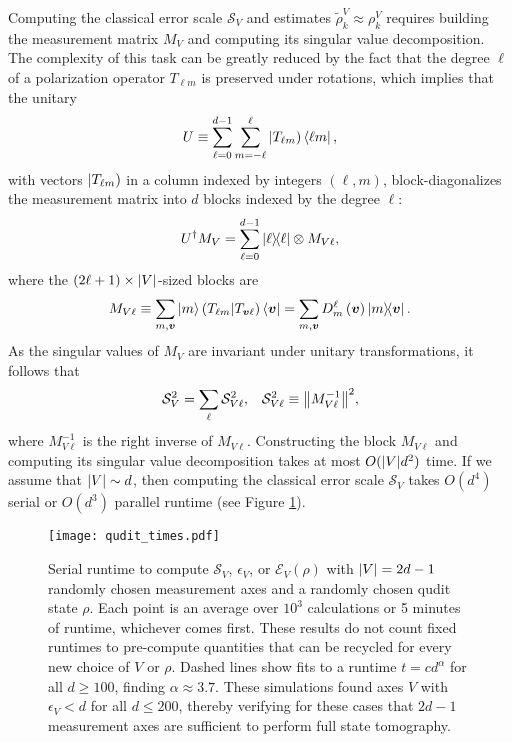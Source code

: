 \documentclass[notitlepage,twocolumn]{revtex4-2}
\newcommand{\p}[1]{\left(#1\right)} %
\renewcommand{\v}{\bm} %
\newcommand{\E}{\mathcal{E}}
\renewcommand{\S}{\mathcal{S}}
\def\oket#1{\mathinner{|{#1})}}
\def\obk#1{\mathinner{({#1})}}
\begin{document}
Computing the classical error scale $\S_V$ and estimates $\tilde\rho^V_k\approx\rho^V_k$ requires building the measurement matrix $M_V$ and computing its singular value decomposition.
The complexity of this task can be greatly reduced by the fact that the degree $\ell$ of a polarization operator $T_{\ell m}$ is preserved under rotations, which implies that the unitary
\begin{align}
  U \equiv \sum_{\ell=0}^{d-1} \sum_{m=-\ell}^\ell
  \oket{T_{\ell m}} \bra{\ell m},
  \label{eq:trans_basis}
\end{align}
with vectors $\oket{T_{\ell m}}$ in a column indexed by integers $\p{\ell,m}$, block-diagonalizes the measurement matrix into $d$ blocks indexed by the degree $\ell$:
\begin{align}
  U^\dag M_V = \sum_{\ell=0}^{d-1} \op{\ell} \otimes M_{V\ell},
\end{align}
where the $\p{2\ell+1}\times\abs{V}$-sized blocks are
\begin{align}
  M_{V\ell} \equiv \sum_{m,\v v} \ket{m} \obk{T_{\ell m}|T_{\v v\ell}} \bra{\v v}
  = \sum_{m,\v v} D^\ell_m\p{\v v} \op{m}{\v v}.
\end{align}
As the singular values of $M_V$ are invariant under unitary transformations, it follows that
\begin{align}
  \S_V^2 = \sum_\ell \S_{V\ell}^2,
  &&
  \S_{V\ell}^2 \equiv \norm{M_{V\ell}^{-1}}^2,
\end{align}
where $M_{V\ell}^{-1}$ is the right inverse of $M_{V\ell}$.
Constructing the block $M_{V\ell}$ and computing its singular value decomposition takes at most $O(\abs{V}d^2)$ time.
If we assume that $\abs{V}\sim d$, then computing the classical error scale $\S_V$ takes $O(d^4)$ serial or $O(d^3)$ parallel runtime (see Figure \ref{fig:times}).

\begin{figure}
  \centering
  \texttt{[image: qudit\_times.pdf]}
  \caption{Serial runtime to compute $\S_V$, $\epsilon_V$, or $\E_V\p{\rho}$ with $\abs{V}=2d-1$ randomly chosen measurement axes and a randomly chosen qudit state $\rho$.
    Each point is an average over $10^3$ calculations or 5 minutes of runtime, whichever comes first.
    These results do not count fixed runtimes to pre-compute quantities that can be recycled for every new choice of $V$ or $\rho$.
    Dashed lines show fits to a runtime $t=c d^\alpha$ for all $d\ge100$, finding $\alpha\approx 3.7$.
    These simulations found axes $V$ with $\epsilon_V<d$ for all $d\le200$, thereby verifying for these cases that $2d-1$ measurement axes are sufficient to perform full state tomography.}
  \label{fig:times}
\end{figure}
\end{document}

